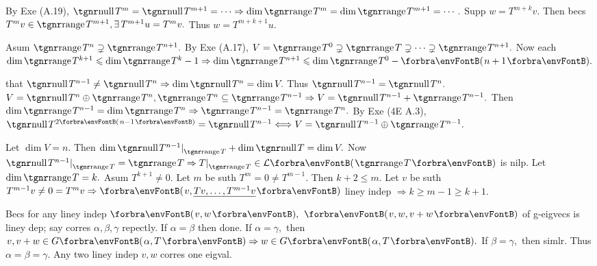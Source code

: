 By Exe (A.19), $\null T^m=\null T^{m+1}=\cdots\Rightarrow\dim\range T^m=\dim\range T^{m+1}=\cdots.$\PfEnd\parSol{}
\Or Supp $w=T^{m+k}v.$ Then becs $T^mv\in\range T^{m+1},\exists\,T^{m+1}u=T^mv.$ Thus $w=T^{m+k+1}u.$\PfEndB
\SepLine

Asum $\range T^{n}\supsetneq\range T^{n+1}.$ By Exe (A.17), $V=\range T^0\supsetneq\range T\supsetneq\cdots\supsetneq\range T^{n+1}.$\parSol{}
Now each $\dim\range T^{k+1}\leqslant\dim\range T^k-1\Rightarrow\dim\range T^{n+1}\leqslant\dim\range T^0-\Par{n+1}.$\PfEnd
\SepLine\pagebreak

\NOTICE that $\null T^{n-1}\neq\null T^n\Rightarrow\dim\null T^n=\dim V.$ Thus $\null T^{n-1}=\null T^n.$\parSol{}
\又 $V=\null T^n\oplus\range T^n,\range T^n\subseteq\range T^{n-1}\Rightarrow V=\null T^{n-1}+\range T^{n-1}.$\PfEnd\parSol{}
\Or Then $\dim\range T^{n-1}=\dim\range T^n\Rightarrow\range T^{n-1}=\range T^n.$\PfEnd\vspace{2pt}\parSol{}
\Or By Exe (4E A.3), $\null T^{2\SmallPar{n-1}}=\null T^{n-1}\Longleftrightarrow V=\null T^{n-1}\oplus\range T^{n-1}.$\PfEnd
\SepLine

Let $\dim V=n.$ Then $\dim\null T^{n-1}\mmid_{\range T}+\dim\null T=\dim V.$\parSol{}
Now $\null T^{n-1}\mmid_{\range T}=\range T\Rightarrow T\mmid_{\range T}\in\Lm{\range T}$ is nilp.\PfEnd\vspace{4pt}\parSol{}
\Or Let $\dim\range T=k.$ Asum $T^{k+1}\neq 0.$ Let $m$ be suth $T^m=0\neq T^{m-1}.$ Then $k+2\leqslant m.$\parSol{}
Let $v$ be suth $T^{m-1}v\neq 0=T^mv\Rightarrow\Par{v,{}$\uline{$Tv,\dots,T^{m-1}v$}$}$ liney indep $\Rightarrow k\geqslant m-1\geqslant k+1.$\PfEndB
\SepLine

Becs for any liney indep $\Par{v,w},$ $\Par{v,w,v+w}$ of g-eigvecs is liney dep; say corres $\alpha,\beta,\gamma$ repectly.\parSol{}
If $\alpha=\beta$ then done. If $\alpha=\gamma,$ then $v,v+w\in G\Par{\alpha,T}\Rightarrow w\in G\Par{\alpha,T}.$ If $\beta=\gamma,$ then simlr.\parSol{}
Thus $\alpha=\beta=\gamma.$ Any two liney indep $v,w$ corres one eigval.\PfEndB
\SepLine

